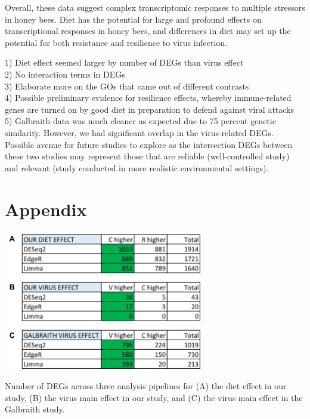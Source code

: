 \documentclass[11pt,a4paper,oldfontcommands,openany]{memoir}
\numberwithin{equation}{section} %
\begin{document}
Overall, these data suggest complex transcriptomic responses to multiple stressors in honey bees.  Diet has the potential for large and profound effects on transcriptional responses in honey bees, and differences in diet may set up the potential for both resistance and resilience to virus infection.   







1) Diet effect seemed larger by number of DEGs than virus effect \\

2) No interaction terms in DEGs \\

3) Elaborate more on the GOs that came out of different contrasts \\

4) Possible preliminary evidence for resilience effects, whereby immune-related genes are turned on by good diet in preparation to defend against viral attacks \\

5) Galbraith data was much cleaner as expected due to 75 percent genetic similarity. However, we had significant overlap in the virus-related DEGs. Possible avenue for future studies to explore as the intersection DEGs between these two studies may represent those that are reliable (well-controlled study) and relevant (study conducted in more realistic environmental settings).




\section{Appendix}

\begin{table}[H]
  \includegraphics[width=0.65\textwidth]{Images/mainEffectDEGs}
  \caption{Number of DEGs across three analysis pipelines for (A) the diet effect in our study, (B) the virus main effect in our study, and (C) the virus main effect in the Galbraith study.}
  \label{tbl:mainEffectDEGs}
\end{table}
\end{document}
